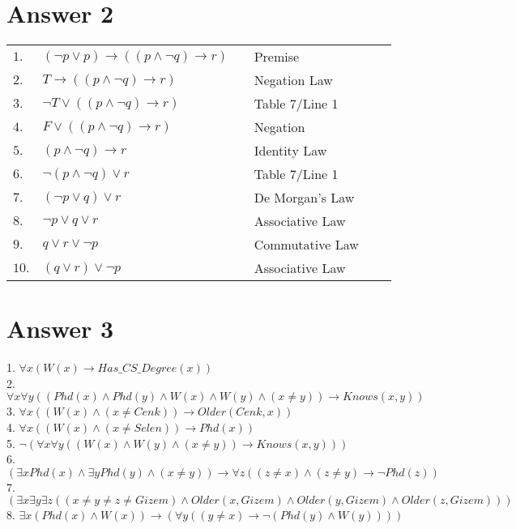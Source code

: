 \documentclass[12pt]{article}
\begin{document}
\section*{Answer 2}
\begin{table}[H]
	\begin{tabular}{*6{l}}
		$1.$ & $(\neg p \vee p) \rightarrow ((p \wedge \neg q) \rightarrow r)$ &  & Premise \\ 
		$2.$ & $T \rightarrow ((p \wedge \neg q) \rightarrow r)$ &  & Negation Law\\ 
		$3.$ & $\neg T \vee ((p \wedge \neg q) \rightarrow r)$ &  & Table 7/Line 1\\
		$4.$ & $F \vee ((p \wedge \neg q) \rightarrow r)$ &  & Negation\\
		$5.$ & $(p \wedge \neg q) \rightarrow r$ &  & Identity Law\\ 
		$6.$ & $\neg (p \wedge \neg q) \vee r$ &  & Table 7/Line 1\\
		$7.$ & $(\neg p \vee q) \vee r$ & & De Morgan's Law\\ 
		$8.$ & $\neg p \vee q \vee r$ & & Associative Law\\
		$9.$ & $q \vee r \vee \neg p$ & & Commutative Law \\
		$10.$ & $(q \vee r) \vee \neg p$ & & Associative Law \\ 
	\end{tabular}
\end{table}


\section*{Answer 3}
1. $\forall x (W(x) \rightarrow Has\_CS\_Degree(x))$ \\
2. $\forall x \forall y ((Phd(x) \wedge Phd(y) \wedge W(x) \wedge W(y) \wedge (x \neq y))\rightarrow Knows(x,y))$\\
3. $\forall x ((W(x) \wedge (x \neq Cenk)) \rightarrow Older(Cenk,x))$\\
4. $\forall x ((W(x) \wedge (x \neq Selen))\rightarrow Phd(x))$\\
5. $\neg (\forall x \forall y ((W(x) \wedge W(y) \wedge (x\neq y))\rightarrow Knows(x,y)))$\\
6. $(\exists x Phd(x) \wedge \exists y Phd(y) \wedge (x\neq y))\rightarrow \forall z ((z \neq x)\wedge (z \neq y)\rightarrow \neg Phd(z))$\\
7. $(\exists x \exists y \exists z ((x \neq y \neq z \neq Gizem) \wedge Older(x,Gizem) \wedge Older(y,Gizem) \wedge Older(z,Gizem)))$\\
8. $\exists x (Phd(x) \wedge W(x))\rightarrow (\forall y ((y \neq x) \rightarrow \neg(Phd(y) \wedge W(y))))$
\end{document}
